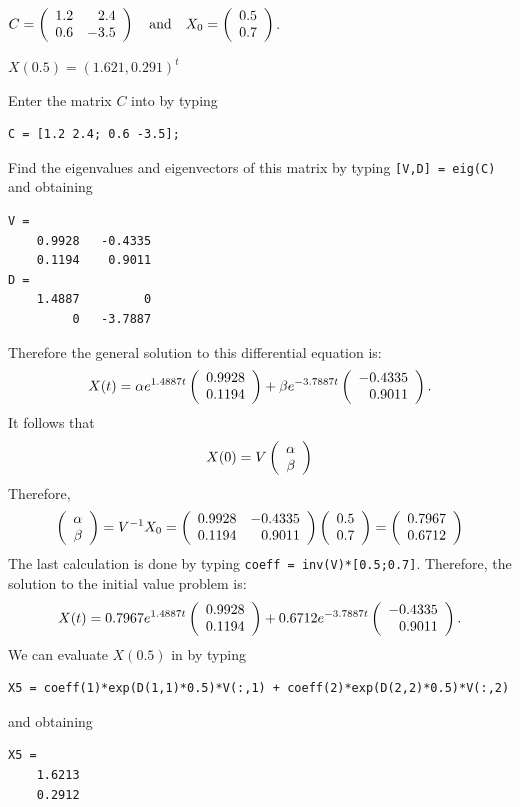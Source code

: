 \documentclass{ximera}
\begin{document}
\begin{computerExercise}  \label{c4.10A.4b}  
$C = \left(\begin{array}{rr} 1.2 & 2.4\\ 0.6 &-3.5\end{array}\right) \quad\mbox{and}\quad X_0=\left(\begin{array}{r} 0.5 \\ 0.7\end{array}\right)$.

\begin{solution}
\ans $X(0.5) = (1.621,0.291)^t$ %


Enter the matrix $C$ into \Matlab by typing
\begin{verbatim}
C = [1.2 2.4; 0.6 -3.5];
\end{verbatim}
Find the eigenvalues and eigenvectors of this matrix by typing {\tt [V,D] = eig(C)}
and obtaining
\begin{verbatim}
V =
    0.9928   -0.4335
    0.1194    0.9011
D =
    1.4887         0
         0   -3.7887
\end{verbatim}
Therefore the general solution to this differential equation is:
\[
X(t) = \alpha e^{1.4887 t}\left(\begin{array}{r} 0.9928 \\ 0.1194\end{array}\right) +
\beta e^{-3.7887 t}\left(\begin{array}{r} -0.4335 \\ 0.9011\end{array}\right).
\]
It follows that 
\[
X(0) = V \left(\begin{array}{r} \alpha \\ \beta\end{array}\right)
\]
Therefore,
\[
\left(\begin{array}{r} \alpha \\ \beta\end{array}\right) = V^{-1} X_0 = 
\left(\begin{array}{rr} 0.9928 & -0.4335\\ 0.1194 &0.9011\end{array}\right)\left(\begin{array}{r} 0.5 \\ 0.7\end{array}\right) = \left(\begin{array}{r} 0.7967 \\ 0.6712\end{array}\right)
\]
The last calculation is done by typing {\tt coeff = inv(V)*[0.5;0.7]}. 
Therefore, the solution to the initial value problem is:
\[
X(t) = 0.7967e^{1.4887 t}\left(\begin{array}{r} 0.9928 \\ 0.1194\end{array}\right) +
0.6712e^{-3.7887 t}\left(\begin{array}{r} -0.4335 \\ 0.9011\end{array}\right).
\]
We can evaluate $X(0.5)$ in \Matlab by typing
\begin{verbatim}
X5 = coeff(1)*exp(D(1,1)*0.5)*V(:,1) + coeff(2)*exp(D(2,2)*0.5)*V(:,2)
\end{verbatim}
and obtaining
\begin{verbatim}
X5 =
    1.6213
    0.2912
\end{verbatim}



\end{solution}
\end{computerExercise}
\end{document}
